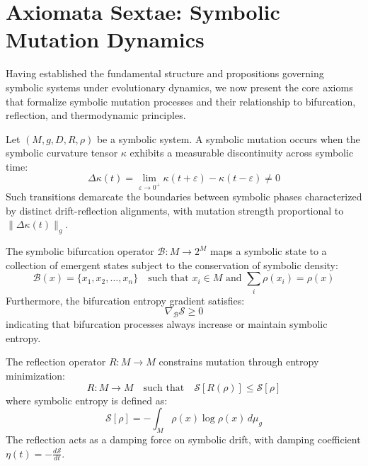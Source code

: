 \section{Axiomata Sextae: Symbolic Mutation Dynamics}
\label{sec:bk6_axiomata_sextae_symbolic_mutation_dynamics}
Having established the fundamental structure and propositions governing symbolic systems under evolutionary dynamics, we now present the core axioms that formalize symbolic mutation processes and their relationship to bifurcation, reflection, and thermodynamic principles.
\begin{axiom}
\label{axiom:bk6_symbolic_mutation_as_curvature_transition}
Let $(M, g, D, R, \rho)$ be a symbolic system. A symbolic mutation occurs when the symbolic curvature tensor $\kappa$ exhibits a measurable discontinuity across symbolic time:
\begin{equation}
\Delta\kappa(t) = \lim_{\varepsilon \to 0^+} \kappa(t + \varepsilon) - \kappa(t - \varepsilon) \neq 0
\end{equation}
Such transitions demarcate the boundaries between symbolic phases characterized by distinct drift-reflection alignments, with mutation strength proportional to $\|\Delta\kappa(t)\|_g$.
\end{axiom}
\begin{axiom}
\label{axiom:bk6_bifurcation_as_emergence_operator}
The symbolic bifurcation operator $\mathcal{B}: M \to 2^M$ maps a symbolic state to a collection of emergent states subject to the conservation of symbolic density:
\begin{equation}
\mathcal{B}(x) = \{x_1, x_2, \ldots, x_n\} \quad \text{such that } x_i \in M \text{ and } \sum_i \rho(x_i) = \rho(x)
\end{equation}
Furthermore, the bifurcation entropy gradient satisfies:
\begin{equation}
\nabla_{\mathcal{B}} \mathcal{S} \geq 0
\end{equation}
indicating that bifurcation processes always increase or maintain symbolic entropy.
\end{axiom}
\begin{axiom}
\label{axiom:bk6_reflective_regulation_of_mutation}
The reflection operator $R: M \to M$ constrains mutation through entropy minimization:
\begin{equation}
R : M \to M \quad \text{such that} \quad \mathcal{S}[R(\rho)] \leq \mathcal{S}[\rho]
\end{equation}
where symbolic entropy is defined as:
\begin{equation}
\mathcal{S}[\rho] = -\int_M \rho(x) \log \rho(x) \, d\mu_g
\end{equation}
The reflection acts as a damping force on symbolic drift, with damping coefficient $\eta(t) = -\frac{d\mathcal{S}}{dt}$.
\end{axiom}
